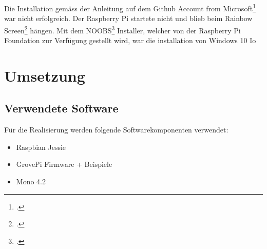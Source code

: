 Die Installation gemäss der Anleitung auf dem Github Account from Microsoft\footcite{install_win10iot_2016-04-25} war nicht erfolgreich. 
Der Raspberry Pi startete nicht und blieb beim Rainbow Screen\footcite{RPi_Rainbowscreen_2016-04-25} hängen. 
Mit dem NOOBS\footcite{NOOBS_2016-04-25} Installer, welcher von der Raspberry Pi Foundation zur Verfügung gestellt wird, war die installation von Windows 10 Io


\section{Umsetzung}

\subsection{Verwendete Software}
Für die Realisierung werden folgende Softwarekomponenten verwendet:

\begin{itemize}
\item Raspbian Jessie
\item GrovePi Firmware + Beispiele
\item Mono 4.2
\end{itemize}





